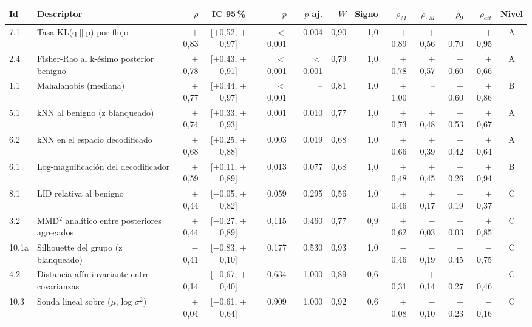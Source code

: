 \begin{tabular}{@{}l>{\raggedright\arraybackslash}p{3.3cm}rcrrrrrrrrc@{}}
\toprule
Id & Descriptor & $\bar\rho$ & IC 95\,\% & $p$ & $p$ aj. & $W$ & Signo & $\rho_{M}$ & $\rho_{\cdot|M}$ & $\rho_{9}$ & $\rho_{att}$ & Nivel \\
\midrule
7.1 & Tasa KL(q$\|$p) por flujo & $+$0{,}83 & [$+$0{,}52, $+$0{,}97] & $<$0{,}001 & 0{,}004 & 0{,}90 & 1{,}0 & $+$0{,}89 & $+$0{,}56 & $+$0{,}70 & $+$0{,}95 & A \\
2.4 & Fisher-Rao al k-ésimo posterior benigno & $+$0{,}78 & [$+$0{,}43, $+$0{,}91] & $<$0{,}001 & $<$0{,}001 & 0{,}79 & 1{,}0 & $+$0{,}78 & $+$0{,}57 & $+$0{,}60 & $+$0{,}66 & A \\
1.1 & Mahalanobis (mediana) & $+$0{,}77 & [$+$0{,}44, $+$0{,}97] & $<$0{,}001 & -- & 0{,}81 & 1{,}0 & $+$1{,}00 & -- & $+$0{,}60 & $+$0{,}86 & B \\
5.1 & kNN al benigno (z blanqueado) & $+$0{,}74 & [$+$0{,}33, $+$0{,}93] & 0{,}001 & 0{,}010 & 0{,}77 & 1{,}0 & $+$0{,}73 & $+$0{,}48 & $+$0{,}53 & $+$0{,}67 & A \\
6.2 & kNN en el espacio decodificado & $+$0{,}68 & [$+$0{,}25, $+$0{,}88] & 0{,}003 & 0{,}019 & 0{,}68 & 1{,}0 & $+$0{,}66 & $+$0{,}39 & $+$0{,}42 & $+$0{,}64 & A \\
6.1 & Log-magnificación del decodificador & $+$0{,}59 & [$+$0{,}11, $+$0{,}89] & 0{,}013 & 0{,}077 & 0{,}68 & 1{,}0 & $+$0{,}48 & $+$0{,}45 & $+$0{,}26 & $+$0{,}94 & B \\
8.1 & LID relativa al benigno & $+$0{,}44 & [$-$0{,}05, $+$0{,}82] & 0{,}059 & 0{,}295 & 0{,}56 & 1{,}0 & $+$0{,}46 & $+$0{,}17 & $+$0{,}19 & $+$0{,}37 & C \\
3.2 & MMD$^2$ analítico entre posteriores agregados & $+$0{,}44 & [$-$0{,}27, $+$0{,}89] & 0{,}115 & 0{,}460 & 0{,}77 & 0{,}9 & $+$0{,}62 & $-$0{,}03 & $+$0{,}03 & $+$0{,}85 & C \\
10.1a & Silhouette del grupo (z blanqueado) & $-$0{,}41 & [$-$0{,}83, $+$0{,}10] & 0{,}177 & 0{,}530 & 0{,}93 & 1{,}0 & $-$0{,}46 & $-$0{,}19 & $-$0{,}45 & $-$0{,}75 & C \\
4.2 & Distancia afín-invariante entre covarianzas & $-$0{,}14 & [$-$0{,}67, $+$0{,}40] & 0{,}634 & 1{,}000 & 0{,}89 & 0{,}6 & $-$0{,}31 & $+$0{,}14 & $-$0{,}27 & $-$0{,}46 & C \\
10.3 & Sonda lineal sobre ($\mu$, log $\sigma^2$) & $+$0{,}04 & [$-$0{,}61, $+$0{,}64] & 0{,}909 & 1{,}000 & 0{,}92 & 0{,}6 & $+$0{,}08 & $-$0{,}10 & $-$0{,}23 & $-$0{,}16 & C \\
\bottomrule
\end{tabular}
